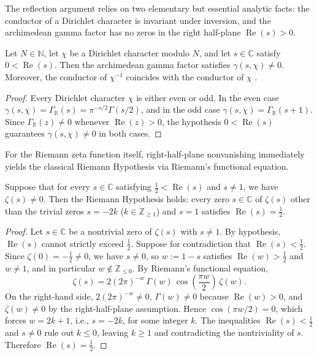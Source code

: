 The reflection argument relies on two elementary but essential analytic facts:
the conductor of a Dirichlet character is invariant under inversion, and the
archimedean gamma factor has no zeros in the right half-plane
$\operatorname{Re}(s) > 0$.

\begin{lemma}
\label{lem:ch02-gamma-nonvanishing}
Let $N \in \mathbb{N}$, let $\chi$ be a Dirichlet character modulo $N$, and let
$s \in \mathbb{C}$ satisfy $0 < \operatorname{Re}(s)$.
Then the archimedean gamma factor satisfies $\gamma(s, \chi) \neq 0$.
Moreover, the conductor of $\chi^{-1}$ coincides with the conductor of $\chi$
.
\end{lemma}

\begin{proof}
Every Dirichlet character $\chi$ is either even or odd.
In the even case $\gamma(s, \chi) = \Gamma_{\mathbb{R}}(s) = \pi^{-s/2}\Gamma(s/2)$,
and in the odd case $\gamma(s, \chi) = \Gamma_{\mathbb{R}}(s + 1)$.
Since $\Gamma_{\mathbb{R}}(z) \neq 0$ whenever $\operatorname{Re}(z) > 0$,
the hypothesis $0 < \operatorname{Re}(s)$ guarantees $\gamma(s, \chi) \neq 0$ in
both cases.
\end{proof}

For the Riemann zeta function itself, right-half-plane nonvanishing immediately
yields the classical Riemann Hypothesis via Riemann's functional equation.

\begin{proposition}
\label{prop:ch02-rh-of-right}
Suppose that for every $s \in \mathbb{C}$ satisfying $\tfrac{1}{2} < \operatorname{Re}(s)$
and $s \neq 1$, we have $\zeta(s) \neq 0$.
Then the Riemann Hypothesis holds: every zero $s \in \mathbb{C}$ of $\zeta(s)$
other than the trivial zeros $s = -2k$ ($k \in \mathbb{Z}_{\ge 1}$) and $s = 1$
satisfies $\operatorname{Re}(s) = \tfrac{1}{2}$.
\end{proposition}

\begin{proof}
Let $s \in \mathbb{C}$ be a nontrivial zero of $\zeta(s)$ with $s \neq 1$.
By hypothesis, $\operatorname{Re}(s)$ cannot strictly exceed $\tfrac{1}{2}$.
Suppose for contradiction that $\operatorname{Re}(s) < \tfrac{1}{2}$.
Since $\zeta(0) = -\tfrac{1}{2} \neq 0$, we have $s \neq 0$, so
$w := 1 - s$ satisfies $\operatorname{Re}(w) > \tfrac{1}{2}$ and $w \neq 1$,
and in particular $w \notin \mathbb{Z}_{\le 0}$.
By Riemann's functional equation,
\[
  \zeta(s)
  = 2 (2\pi)^{-w}\,\Gamma(w)\,\cos\!\left(\frac{\pi w}{2}\right)\,\zeta(w).
\]
On the right-hand side, $2(2\pi)^{-w} \neq 0$, $\Gamma(w) \neq 0$ because
$\operatorname{Re}(w) > 0$, and $\zeta(w) \neq 0$ by the right-half-plane
assumption.
Hence $\cos(\pi w / 2) = 0$, which forces $w = 2k + 1$, i.e., $s = -2k$, for
some integer $k$.
The inequalities $\operatorname{Re}(s) < \tfrac{1}{2}$ and $s \neq 0$ rule out
$k \le 0$, leaving $k \ge 1$ and contradicting the nontriviality of $s$.
Therefore $\operatorname{Re}(s) = \tfrac{1}{2}$.
\end{proof}

